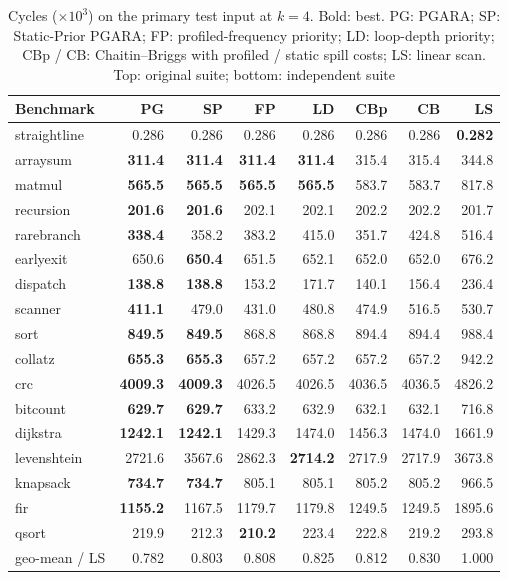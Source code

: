 \documentclass{ieeeaccess}
\newcommand{\MG}{PGARA}
\begin{document}
\begin{table}[!t]
\centering
\caption{Cycles ($\times10^3$) on the primary test input at $k=4$. Bold: best.
PG: \MG; SP: Static-Prior \MG; FP: profiled-frequency priority; LD:
loop-depth priority; CBp / CB: Chaitin--Briggs with profiled / static
spill costs; LS: linear scan. Top: original suite; bottom: independent
suite}
\label{tab:k4}
\footnotesize
\begin{tabular}{@{}lrrrrrrr@{}}
\toprule
Benchmark & PG & SP & FP & LD & CBp & CB & LS \\
\midrule
straightline & 0.286 & 0.286 & 0.286 & 0.286 & 0.286 & 0.286 & \textbf{0.282} \\
arraysum & \textbf{311.4} & \textbf{311.4} & \textbf{311.4} & \textbf{311.4} & 315.4 & 315.4 & 344.8 \\
matmul & \textbf{565.5} & \textbf{565.5} & \textbf{565.5} & \textbf{565.5} & 583.7 & 583.7 & 817.8 \\
recursion & \textbf{201.6} & \textbf{201.6} & 202.1 & 202.1 & 202.2 & 202.2 & 201.7 \\
rarebranch & \textbf{338.4} & 358.2 & 383.2 & 415.0 & 351.7 & 424.8 & 516.4 \\
earlyexit & 650.6 & \textbf{650.4} & 651.5 & 652.1 & 652.0 & 652.0 & 676.2 \\
dispatch & \textbf{138.8} & \textbf{138.8} & 153.2 & 171.7 & 140.1 & 156.4 & 236.4 \\
scanner & \textbf{411.1} & 479.0 & 431.0 & 480.8 & 474.9 & 516.5 & 530.7 \\
sort & \textbf{849.5} & \textbf{849.5} & 868.8 & 868.8 & 894.4 & 894.4 & 988.4 \\
collatz & \textbf{655.3} & \textbf{655.3} & 657.2 & 657.2 & 657.2 & 657.2 & 942.2 \\
\midrule
crc & \textbf{4009.3} & \textbf{4009.3} & 4026.5 & 4026.5 & 4036.5 & 4036.5 & 4826.2 \\
bitcount & \textbf{629.7} & \textbf{629.7} & 633.2 & 632.9 & 632.1 & 632.1 & 716.8 \\
dijkstra & \textbf{1242.1} & \textbf{1242.1} & 1429.3 & 1474.0 & 1456.3 & 1474.0 & 1661.9 \\
levenshtein & 2721.6 & 3567.6 & 2862.3 & \textbf{2714.2} & 2717.9 & 2717.9 & 3673.8 \\
knapsack & \textbf{734.7} & \textbf{734.7} & 805.1 & 805.1 & 805.2 & 805.2 & 966.5 \\
fir & \textbf{1155.2} & 1167.5 & 1179.7 & 1179.8 & 1249.5 & 1249.5 & 1895.6 \\
qsort & 219.9 & 212.3 & \textbf{210.2} & 223.4 & 222.8 & 219.2 & 293.8 \\
\midrule
geo-mean / LS & 0.782 & 0.803 & 0.808 & 0.825 & 0.812 & 0.830 & 1.000 \\
\bottomrule
\end{tabular}
\end{table}
\end{document}
